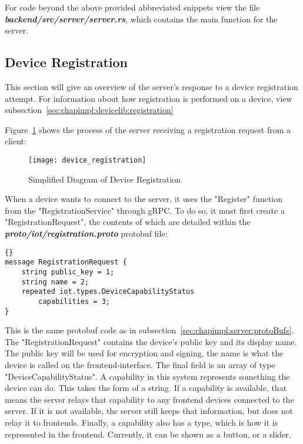 For code beyond the above provided abbreviated snippets view the file \textbf{\textit{backend/src/server/server.rs}}, which contains the main function for the server.

\subsection{Device Registration} \label{sec:chapimpl:server:registration} 
This section will give an overview of the server's response to a device registration attempt. For information about how registration is performed on a device, view subsection~\ref{sec:chapimpl:devicelib:registration}

Figure~\ref{fig:server_registration} shows the process of the server receiving a registration request from a client:
\begin{figure}[h]
\caption{Simplified Diagram of Device Registration}
\texttt{[image: device\_registration]}
\label{fig:server_registration}
\end{figure}

When a device wants to connect to the server, it uses the "Register" function from the "RegistrationService" through gRPC. To do so, it must first create a "RegistrationRequest", the contents of which are detailed within the \textit{\textbf{proto/iot/registration.proto}} protobuf file:

\begin{lstlisting}[language=protobuf3, style=boxed, showstringspaces=false]{}
message RegistrationRequest {
    string public_key = 1;
    string name = 2;
    repeated iot.types.DeviceCapabilityStatus 
        capabilities = 3;
}
\end{lstlisting}
This is the same protobuf code as in subsection~\ref{sec:chapimpl:server:protoBufs}. The "RegistrationRequest" contains the device's public key and its display name. The public key will be used for encryption and signing, the name is what the device is called on the frontend-interface. The final field is an array of type "DeviceCapabilityStatus". A capability in this system represents something the device can do. This takes the form of a string. If a capability is available, that means the server relays that capability to any frontend devices connected to the server. If it is not available, the server still keeps that information, but does not relay it to frontends. Finally, a capability also has a type, which is how it is represented in the frontend. Currently, it can be shown as a button, or a slider.

